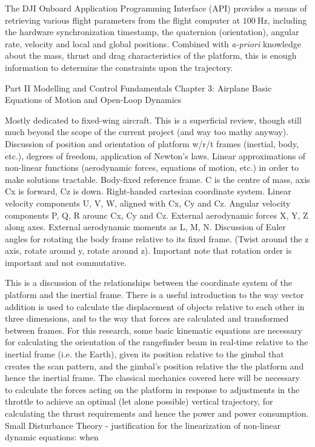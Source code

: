 The DJI Onboard Application Programming Interface (API) \cite{DJI2018} provides a means of retrieving various flight parameters from the flight computer at $\SI{100}\Hz$, including the hardware synchronization timestamp, the quaternion (orientation), angular rate, velocity and local and global positions. Combined with \emph{a-priori} knowledge about the mass, thrust and drag characteristics of the platform, this is enough information to determine the constraints upon the trajectory.

Part II Modelling and Control Fundamentals
Chapter 3: Airplane Basic Equations of Motion and Open-Loop Dynamics

Mostly dedicated to fixed-wing aircraft.
This is a superficial review, though still much beyond the scope of the current project (and way too mathy anyway).
Discussion of position and orientation of platform w/r/t frames (inertial, body, etc.), degrees of freedom, application of Newton’s laws.
Linear approximations of non-linear functions (aerodynamic forces, equations of motion, etc.) in order to make solutions tractable.
Body-fixed reference frame. C is the centre of mass, axis Cx is forward, Cz is down. Right-handed cartesian coordinate system.
Linear velocity components U, V, W, aligned with Cx, Cy and Cz.
Angular velocity components P, Q, R arounc Cx, Cy and Cz.
External aerodynamic forces X, Y, Z along axes. External aerodynamic moments as L, M, N.
Discussion of Euler angles for rotating the body frame relative to its fixed frame. (Twist around the z axis, rotate around y, rotate around z).
Important note that rotation order is important and not commutative.


This is a discussion of the relationships between the coordinate system of the platform and the inertial frame. There is a useful introduction to the way vector addition is used to calculate the displacement of objects relative to each other in three dimensions, and to the way that forces are calculated and transformed between frames. 
For this research, some basic kinematic equations are necessary for calculating the orientation of the rangefinder beam in real-time relative to the inertial frame (i.e. the Earth), given its position relative to the gimbal that creates the scan pattern, and the gimbal’s position relative the the platform and hence the inertial frame. 
The classical mechanics covered here will be necessary to calculate the forces acting on the platform in response to adjustments in the throttle to achieve an optimal (let alone possible) vertical trajectory, for calculating the thrust requirements and hence the power and power consumption.
Small Disturbance Theory - justification for the linearization of non-linear dynamic equations: when 

